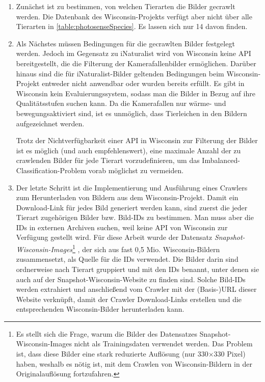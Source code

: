 \begin{enumerate}
	\item Zunächst ist zu bestimmen, von welchen Tierarten die Bilder gecrawlt werden. Die Datenbank des Wisconsin-Projekts verfügt aber nicht über alle Tierarten in \autoref{table:photosenseSpecies}. Es lassen sich nur 14 davon finden.
	
	\item Als Nächstes müssen Bedingungen für die gecrawlten Bilder festgelegt werden. Jedoch im Gegensatz zu iNaturalist wird von Wisconsin keine API bereitgestellt, die die Filterung der Kamerafallenbilder ermöglichen. Darüber hinaus sind die für iNaturalist-Bilder geltenden Bedingungen beim Wisconsin-Projekt entweder nicht anwendbar oder wurden  bereits erfüllt. Es gibt in Wisconsin kein Evaluierungssystem, sodass man die Bilder in Bezug auf ihre Qualitätsstufen suchen kann. Da die Kamerafallen nur wärme- und bewegungsaktiviert sind, ist es unmöglich, dass Tierleichen in den Bildern aufgezeichnet werden. 
	
	Trotz der Nichtverfügbarkeit einer API in Wisconsin zur Filterung der Bilder ist es möglich (und auch empfehlenswert), eine maximale Anzahl der zu crawlenden Bilder für jede Tierart vorzudefinieren, um das Imbalanced-Classification-Problem vorab möglichst zu vermeiden. %
	
	\item Der letzte Schritt ist die Implementierung und Ausführung eines Crawlers zum Herunterladen von Bildern aus dem Wisconsin-Projekt. Damit ein Download-Link für jedes Bild generiert werden kann, sind zuerst die jeder Tierart zugehörigen Bilder bzw. Bild-IDs zu bestimmen.	Man muss aber die IDs in externen Archiven suchen, weil keine API von Wisconsin zur Verfügung gestellt wird. Für diese Arbeit wurde der Datensatz \emph{Snapshot-Wisconsin-Images}\footnote{Es stellt sich die Frage, warum die Bilder des Datensatzes Snapshot-Wisconsin-Images nicht als Trainingsdaten verwendet werden. Das Problem ist, dass diese Bilder eine stark reduzierte Auflösung (nur 330$\times$330 Pixel) haben, weshalb es nötig ist, mit dem Crawlen von Wisconsin-Bildern in der Originalauflösung fortzufahren.} \cite{WCSOrigin}, der sich aus fast 0,5 Mio. Wisconsin-Bildern zusammensetzt, als Quelle für die IDs verwendet. Die Bilder darin sind ordnerweise nach Tierart gruppiert und mit den IDs benannt, unter denen sie auch auf der Snapshot-Wisconsin-Website zu finden sind. Solche Bild-IDs werden extrahiert und anschließend vom Crawler mit der (Basis-)URL dieser Website verknüpft, damit der Crawler Download-Links erstellen und die entsprechenden Wisconsin-Bilder herunterladen kann.
	
\end{enumerate}


